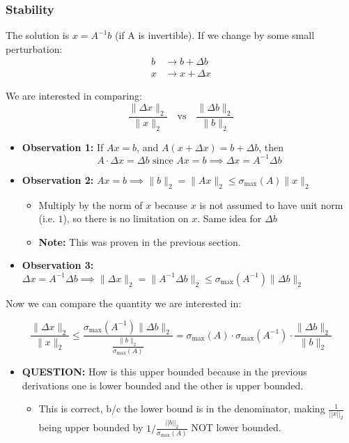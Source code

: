 \subsubsection{Stability}
\begin{derivation}
        The solution is \( x = A^{-1} b \) (if A is invertible). If we change by some small perturbation:
        \begin{align*}
        b &\rightarrow b + \Delta b \\
        x &\rightarrow x + \Delta x
        \end{align*}
    
        We are interested in comparing:
        \begin{equation*}
        \frac{\|\Delta x\|_2}{\|x\|_2} \quad \text{vs} \quad \frac{\|\Delta b\|_2}{\|b\|_2}
        \end{equation*}
        \vspace{1em}

\begin{itemize}
    \item \textbf{Observation 1:} If \( Ax = b \), and \( A(x + \Delta x) = b + \Delta b \), then 
        \[
        A \cdot \Delta x = \Delta b \text{ since $Ax=b$}\implies \Delta x = A^{-1} \Delta b
        \]
    \item \textbf{Observation 2:} \( Ax = b \implies \| b \|_2 = \| A x \|_2 \leq \sigma_{\max}(A) \| x \|_2 \)
    \begin{itemize}
        \item Multiply by the norm of $x$ because $x$ is not assumed to have unit norm (i.e. $1$), so there is no limitation on $x$. Same idea for $\Delta b$
        \item \textbf{Note:} This was proven in the previous section.
    \end{itemize}
    \item \textbf{Observation 3:} \( \Delta x = A^{-1} \Delta b \implies \| \Delta x \|_2 = \| A^{-1} \Delta b \|_2 \leq \sigma_{\max}(A^{-1}) \| \Delta b \|_2 \)
\end{itemize}
\vspace{1em}

Now we can compare the quantity we are interested in: 

\begin{equation*}
    \frac{\|\Delta x\|_2}{\|x\|_2} \leq \frac{\sigma_{\max}(A^{-1}) \|\Delta b\|_2}{\frac{\|b\|_2}{\sigma_{\max}(A)}} 
    = \sigma_{\max}(A) \cdot \sigma_{\max}(A^{-1}) \cdot \frac{\|\Delta b\|_2}{\|b\|_2}
\end{equation*}
\begin{itemize}
    \item \textbf{QUESTION:} How is this upper bounded because in the previous derivations one is lower bounded and the other is upper bounded. 
    \begin{itemize}
        \item This is correct, b/c the lower bound is in the denominator, making $\frac{1}{||x||_2}$ being upper bounded by $1/\frac{||b||_2}{\sigma_{\max}(A)}$ NOT lower bounded.
    \end{itemize}
\end{itemize}
\vspace{1em}


\end{derivation}
